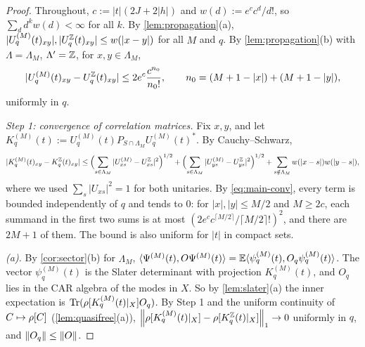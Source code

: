 \begin{proof}
Throughout, $c:=|t|(2J+2|h|)$ and $w(d):=e^cc^d/d!$, so $\sum_dd^kw(d)<\infty$ for all $k$.  By
\cref{lem:propagation}(a), $|U^{(M)}_q(t)_{xy}|,|U^{\mathbb{Z}}_q(t)_{xy}|\le w(|x-y|)$ for all $M$ and $q$.  By
\cref{lem:propagation}(b) with $\Lambda=\Lambda_M$, $\Lambda'=\mathbb{Z}$, for $x,y\in\Lambda_M$,
\begin{equation}\label{eq:main-conv}
  |U^{(M)}_q(t)_{xy}-U^{\mathbb{Z}}_q(t)_{xy}|\le2e^c\frac{c^{n_0}}{n_0!},\qquad n_0=(M+1-|x|)+(M+1-|y|),
\end{equation}
uniformly in $q$.

\emph{Step 1: convergence of correlation matrices.}  Fix $x,y$, and let
$K^{(M)}_q(t):=U^{(M)}_q(t)P_{S\cap\Lambda_M}U^{(M)}_q(t)^*$.  By Cauchy--Schwarz,
\[
  |K^{(M)}_q(t)_{xy}-K^{\mathbb{Z}}_q(t)_{xy}|
  \le\Bigl(\sum_{s\in\Lambda_M}|U^{(M)}_{xs}-U^{\mathbb{Z}}_{xs}|^2\Bigr)^{1/2}+\Bigl(\sum_{s\in\Lambda_M}|U^{(M)}_{ys}-U^{\mathbb{Z}}_{ys}|^2\Bigr)^{1/2}
  +\sum_{s\notin\Lambda_M}w(|x-s|)w(|y-s|),
\]
where we used $\sum_s|U_{xs}|^2=1$ for both unitaries.  By \eqref{eq:main-conv}, every term is bounded independently of
$q$ and tends to $0$: for $|x|,|y|\le M/2$ and $M\ge2c$, each summand in the first two sums is at most
$(2e^cc^{\lceil M/2\rceil}/\lceil M/2\rceil!)^2$, and there are $2M+1$ of them.  The bound is also uniform for $|t|$ in
compact sets.

\emph{(a).}  By \cref{cor:sector}(b) for $\Lambda_M$,
$\langle\Psi^{(M)}(t),O\Psi^{(M)}(t)\rangle=\mathbb{E}\langle\psi^{(M)}_q(t),O_q\psi^{(M)}_q(t)\rangle$.  The vector $\psi^{(M)}_q(t)$ is the
Slater determinant with projection $K^{(M)}_q(t)$, and $O_q$ lies in the CAR algebra of the modes in $X$.  So by
\cref{lem:slater}(a) the inner expectation is $\operatorname{Tr}(\rho[K^{(M)}_q(t)|_X]O_q)$.  By Step 1 and the uniform continuity
of $C\mapsto\rho[C]$ (\cref{lem:quasifree}(a)),
$\left\|\rho[K^{(M)}_q(t)|_X]-\rho[K^{\mathbb{Z}}_q(t)|_X]\right\|_1\to0$ uniformly in $q$, and $\left\|O_q\right\|\le\left\|O\right\|$.


\end{proof}
